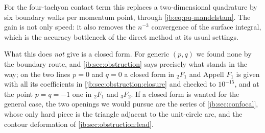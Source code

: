 For the four-tachyon contact term this replaces a two-dimensional quadrature by six boundary walks
per momentum point, through \eqref{jb:eq:pq-mandelstam}.
The gain is not only speed: it also removes the $n^{-3}$ convergence of the surface integral, which
is the accuracy bottleneck of the direct method at its usual settings.

What this does \emph{not} give is a closed form.
For generic $(p, q)$ we found none by the boundary route, and \cref{jb:sec:obstruction} says precisely
what stands in the way; on the two lines $p = 0$ and $q = 0$ a closed form in ${}_2F_1$ and Appell
$F_1$ is given with all its coefficients in \cref{jb:sec:obstruction:closure} and checked to
$10^{-15}$, and at the point $p = q = -1$ one in ${}_2F_1$ and ${}_3F_2$.
If a closed form is wanted for the general case, the two openings we would pursue are the series of
\cref{jb:sec:confocal}, whose only hard piece is the triangle adjacent to the unit-circle arc, and the
contour deformation of \cref{jb:sec:obstruction:lead}.


